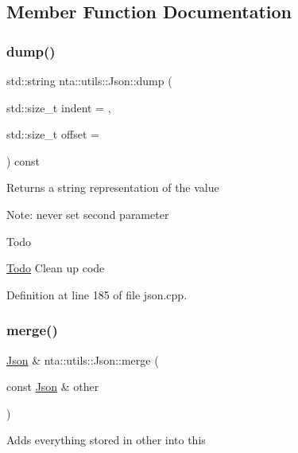 \subsection{Member Function Documentation}
\mbox{\label{classnta_1_1utils_1_1Json_ab0e60f7a55d12aab005d420c8f924035}} 
\subsubsection{\texorpdfstring{dump()}{dump()}}
{\footnotesize\ttfamily std\+::string nta\+::utils\+::\+Json\+::dump (\begin{DoxyParamCaption}\item[{std\+::size\+\_\+t}]{indent = {},  }\item[{std\+::size\+\_\+t}]{offset = {} }\end{DoxyParamCaption}) const}

Returns a string representation of the value

Note\+: never set second parameter

\begin{DoxyRefDesc}{Todo}
\item[\hyperlink{todo__todo000023}{Todo}]Clean up code \end{DoxyRefDesc}


Definition at line 185 of file json.\+cpp.

\mbox{\label{classnta_1_1utils_1_1Json_ac33a8a65bdfaff7c365f99c9ca71eeab}} 
\subsubsection{\texorpdfstring{merge()}{merge()}}
{\footnotesize\ttfamily \hyperlink{classnta_1_1utils_1_1Json}{Json} \& nta\+::utils\+::\+Json\+::merge (\begin{DoxyParamCaption}\item[{const \hyperlink{classnta_1_1utils_1_1Json}{Json} \&}]{other }\end{DoxyParamCaption})}

Adds everything stored in other into this

